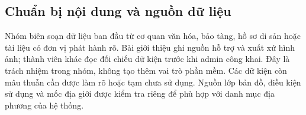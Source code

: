 \subsection{Chuẩn bị nội dung và nguồn dữ liệu}
Nhóm biên soạn dữ liệu ban đầu từ cơ quan văn hóa, bảo tàng, hồ sơ di sản
hoặc tài liệu có đơn vị phát hành rõ. Bài giới thiệu ghi nguồn hỗ trợ và
xuất xứ hình ảnh; thành viên khác đọc đối chiếu dữ kiện trước khi admin
công khai. Đây là trách nhiệm trong nhóm, không tạo thêm vai trò phần mềm.
Các dữ kiện còn mâu thuẫn cần được làm rõ hoặc tạm chưa sử dụng. Nguồn lớp
bản đồ, điều kiện sử dụng và mốc địa giới được kiểm tra riêng để phù hợp
với danh mục địa phương của hệ thống.

\endgroup
